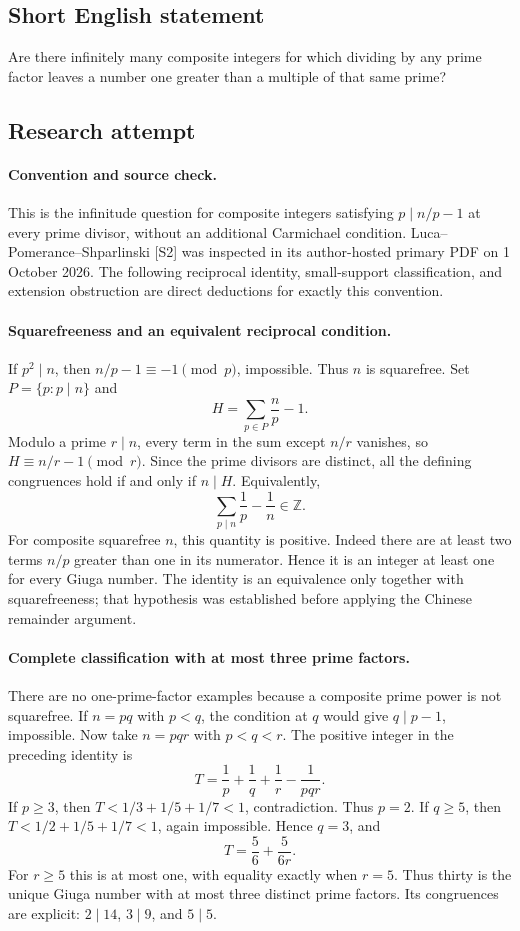 \documentclass[11pt,a4paper]{article}
\begin{document}
\subsection{Short English statement}

Are there infinitely many composite integers for which dividing by any prime factor leaves a number one greater than a multiple of that same prime?

\subsection{Research attempt}

\paragraph{Convention and source check.}
This is the infinitude question for composite integers satisfying
$p\mid n/p-1$ at every prime divisor, without an additional
Carmichael condition. Luca--Pomerance--Shparlinski [S2] was inspected
in its author-hosted primary PDF on 1 October 2026. The following
reciprocal identity, small-support classification, and extension
obstruction are direct deductions for exactly this convention.

\paragraph{Squarefreeness and an equivalent reciprocal condition.}
If $p^2\mid n$, then $n/p-1\equiv-1\pmod p$, impossible. Thus
$n$ is squarefree. Set $P=\{p:p\mid n\}$ and
\[
 H=\sum_{p\in P}\frac np-1.
\]
Modulo a prime $r\mid n$, every term in the sum except $n/r$ vanishes,
so $H\equiv n/r-1\pmod r$. Since the prime divisors are distinct,
all the defining congruences hold if and only if $n\mid H$.
Equivalently,
\[
                   \sum_{p\mid n}\frac1p-\frac1n\in\mathbb Z.
\]
For composite squarefree $n$, this quantity is positive. Indeed there
are at least two terms $n/p$ greater than one in its numerator.
Hence it is an integer at least one for every Giuga number.
The identity is an equivalence only together with squarefreeness;
that hypothesis was established before applying the Chinese remainder
argument.

\paragraph{Complete classification with at most three prime factors.}
There are no one-prime-factor examples because a composite prime power
is not squarefree. If $n=pq$ with $p<q$, the condition at $q$ would
give $q\mid p-1$, impossible. Now take $n=pqr$ with $p<q<r$.
The positive integer in the preceding identity is
\[
                  T=\frac1p+\frac1q+\frac1r-\frac1{pqr}.
\]
If $p\ge3$, then $T<1/3+1/5+1/7<1$, contradiction. Thus $p=2$.
If $q\ge5$, then $T<1/2+1/5+1/7<1$, again impossible. Hence
$q=3$, and
\[
                         T=\frac56+\frac5{6r}.
\]
For $r\ge5$ this is at most one, with equality exactly when $r=5$.
Thus thirty is the unique Giuga number with at most three distinct
prime factors. Its congruences are explicit:
$2\mid14$, $3\mid9$, and $5\mid5$.
\end{document}
